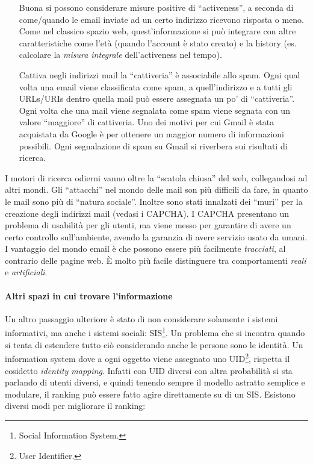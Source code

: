\begin{itemize}

  \item[Buona] si possono considerare misure positive di ``activeness'', a seconda di come/quando le email inviate ad un certo indirizzo ricevono risposta o meno. Come nel classico spazio web, quest'informazione si pu\`o integrare con altre caratteristiche come l'et\`a (quando l'account \`e stato creato) e la history (es. calcolare la \textit{misura integrale} dell'activeness nel tempo).

  \item[Cattiva] negli indirizzi mail la ``cattiveria'' \`e associabile allo spam. Ogni qual volta una email viene classificata come spam, a quell'indirizzo e a tutti gli URLs/URIs dentro quella mail pu\`o essere assegnata un po' di ``cattiveria''. Ogni volta che una mail viene segnalata come spam viene segnata con un valore ``maggiore'' di cattiveria. Uno dei motivi per cui Gmail \`e stata acquistata da Google \`e per ottenere un maggior numero di informazioni possibili. Ogni segnalazione di spam su Gmail si riverbera sui risultati di ricerca.

\end{itemize}

I motori di ricerca odierni vanno oltre la ``scatola chiusa'' del web, collegandosi ad altri mondi. Gli ``attacchi'' nel mondo delle mail son pi\`u difficili da fare, in quanto le mail sono pi\`u di ``natura sociale''. Inoltre sono stati innalzati dei ``muri'' per la creazione degli indirizzi mail (vedasi  i CAPCHA). I CAPCHA presentano un problema di usabilit\`a per gli utenti, ma viene messo per garantire di avere un certo controllo sull'ambiente, avendo la garanzia di avere servizio usato da umani.
I vantaggio del mondo email \`e che possono essere pi\`u facilmente \textit{tracciati}, al contrario delle pagine web. \`E molto pi\`u facile distinguere tra comportamenti \textit{reali} e \textit{artificiali}.

\paragraph*{Altri spazi in cui trovare l'informazione}

Un altro passaggio ulteriore \`e stato di non considerare solamente i sistemi informativi, ma anche i sistemi sociali: SIS\footnote{Social Information System.}. Un problema che si incontra quando si tenta di estendere tutto ci\`o considerando anche le persone sono le identit\`a. Un information system dove a ogni oggetto viene assegnato uno UID\footnote{User Identifier.}, rispetta il cosidetto \textit{identity mapping}. Infatti con UID diversi con altra probabilit\`a si sta parlando di utenti diversi, e quindi tenendo sempre il modello astratto semplice e modulare, il ranking pu\`o essere fatto agire direttamente su di un SIS. Esistono diversi modi per migliorare il ranking:

